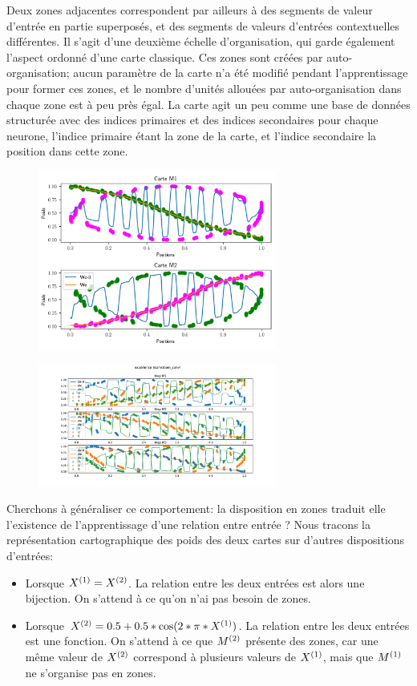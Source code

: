 \documentclass[../main]{subfiles}
\begin{document}
Deux zones adjacentes correspondent par ailleurs à des segments de valeur d'entrée en partie superposés, et des segments de valeurs d'entrées contextuelles différentes. Il s'agit d'une deuxième échelle d'organisation, qui garde également l'aspect ordonné d'une carte classique. Ces zones sont créées par auto-organisation; aucun paramètre de la carte n'a été modifié pendant l'apprentissage pour former ces zones, et le nombre d'unités allouées par auto-organisation dans chaque zone est à peu près égal. La carte agit un peu comme une base de données structurée avec des indices primaires et des indices secondaires pour chaque neurone, l'indice primaire étant la zone de la carte, et l'indice secondaire la position dans cette zone.

\begin{figure}
	\includegraphics[width=0.7\textwidth]{2som_cercle_w.pdf}
\end{figure}

\begin{figure}
	\includegraphics[width=0.7\textwidth]{3som_cercle_w.pdf}
\end{figure}

Cherchons à généraliser ce comportement: la disposition en zones traduit elle l'existence de l'apprentissage d'une relation entre entrée ?
Nous tracons la représentation cartographique des poids des deux cartes sur d'autres dispositions d'entrées: 
\begin{itemize}
	\item Lorsque $X^{({1})} = X^{({2})}$. La relation entre les deux entrées est alors une bijection. On s'attend à ce qu'on n'ai pas besoin de zones.
	\item Lorsque $X^{({2})} = 0.5+0.5*\cos(2*\pi*X^{({1})})$. La relation entre les deux entrées est une fonction. On s'attend à ce que $M^{({2})}$ présente des zones, car une même valeur de $X^{({2})}$ correspond à plusieurs valeurs de $X^{({1})}$, mais que $M^{({1})}$ ne s'organise pas en zones.
\end{itemize}
\end{document}

